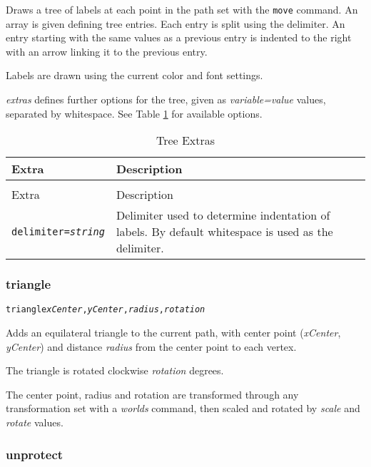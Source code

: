 Draws a tree of labels at each point in the path set with the
\texttt{move} command.
An array is given defining tree entries.
Each entry is split using the delimiter.  An entry starting
with the same values as a previous entry is indented to the
right with an arrow linking it to the previous entry.

Labels are drawn using the current color and font settings.

\textit{extras} defines further options for the tree, given as
\textit{variable=value} values, separated by whitespace.
See Table \ref{treeextras}
for available options.

\begin{longtable}{|l|p{7cm}|}
\hline
\label{treeextras}
Extra & Description \\
\hline
\hline
\endfirsthead
\hline
\caption{Tree Extras} \\
\endfoot

\hline
Extra & Description \\
\hline
\hline
\endhead

\texttt{delimiter=\textit{string}} &

Delimiter used to determine indentation of labels.
By default whitespace is used as the delimiter. \\

\hline
\end{longtable}


\subsubsection{triangle}

\begin{alltt}
triangle \textit{xCenter}, \textit{yCenter}, \textit{radius}, \textit{rotation}
\end{alltt}

Adds an equilateral triangle to the current path, with center
point (\textit{xCenter}, \textit{yCenter}) and distance
\textit{radius}
from the center point to each vertex.

The triangle is rotated clockwise \textit{rotation} degrees.

The center point, radius and rotation are transformed through any
transformation set with a \textit{worlds} command,
then scaled and rotated by \textit{scale}
and \textit{rotate} values.

\subsubsection{unprotect}


